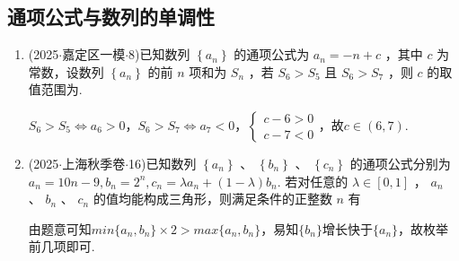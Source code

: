 \subsection*{通项公式与数列的单调性}
\begin{enumerate}
    \item (2025$\cdot$嘉定区一模$\cdot$8)已知数列 $\left\{  {a}_{n}\right\}$ 的通项公式为 ${a}_{n} =  - n + c$ ，其中 $c$ 为常数，设数列 $\left\{  {a}_{n}\right\}$ 的前 $n$ 项和为 ${S}_{n}$ ，若 ${S}_{6} > {S}_{5}$ 且 ${S}_{6} > {S}_{7}$ ，则 $c$ 的取值范围为.
    \begin{jieda}
        ${S}_{6} > {S}_{5} \Longleftrightarrow a_6 > 0$，${S}_{6} > {S}_{7} \Longleftrightarrow a_7 < 0$，$\left\{\begin{array}{l}
            c-6 > 0 \\
            c-7 < 0
        \end{array}\right.$，故$c \in (6, 7)$.
    \end{jieda}

    \item (2025$\cdot$上海秋季卷$\cdot$16)已知数列 $\left\{  {a}_{n}\right\}$ 、 $\left\{  {b}_{n}\right\}$ 、 $\left\{  {c}_{n}\right\}$ 的通项公式分别为 ${a}_{n} = {10n} - 9,{b}_{n} = {2}^{n},{c}_{n} = \lambda {a}_{n} +  \left( {1 - \lambda }\right) {b}_{n}$. 若对任意的 $\lambda  \in  \left\lbrack  {0,1}\right\rbrack$ ， ${a}_{n}$ 、 ${b}_{n}$ 、 ${c}_{n}$ 的值均能构成三角形，则满足条件的正整数 $n$ 有
    \begin{jieda}
        由题意可知$min\{a_n, b_n\} \times 2 > max\{a_n, b_n\}$，易知$\{b_n\}$增长快于$\{a_n\}$，故枚举前几项即可.
    \end{jieda}



\end{enumerate}
